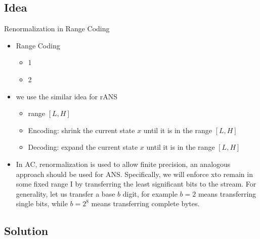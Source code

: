 \subsection{Idea}
\begin{frame}[fragile]{Renormalization in Range Coding}
    \begin{itemize}
        \item Range Coding
        \begin{itemize}
            \item 1
            \item 2
        \end{itemize}
        \item we use the similar idea for rANS
        \begin{itemize}
            \item range $\mathit{[L, H]}$
            \item Encoding: shrink the current state $\mathit{x}$ until it is in the range $\mathit{[L, H]}$ 
            \item Decoding: expand the current state $\mathit{x}$ until it is in the range $\mathit{[L, H]}$
        \end{itemize}
        \item In AC, renormalization is used to allow finite precision, an analogous approach should be used for ANS. Specifically, we will enforce xto remain in some fixed range I by transferring the least significant bits to the stream. For generality, let us transfer a base $\mathit{b}$ digit, for example $\mathit{b}= 2$ means transferring single bits, while $\mathit{b} = 2^8$ means transferring complete bytes.
    \end{itemize}
\end{frame}

\subsection{Solution}
